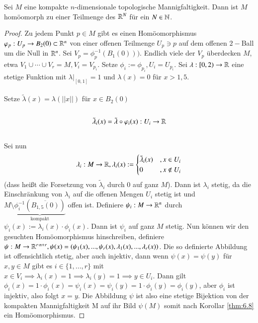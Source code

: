 \documentclass[a4paper,10pt]{scrartcl}
\begin{document}
\begin{st}
 Sei $M$ eine kompakte $n$-dimensionale topologische Mannigfaltigkeit. Dann ist $M$ homöomorph zu einer Teilmenge des $\mathbb{R}^N$ für ein $N\in \mathbb{N}$.
\end{st}
\fixme[fig36]
\begin{proof}
 Zu jedem Punkt $p\in M$ gibt es einen Homöomorphismus $\varphi_p: U_p\to B_2(0) \subset \mathbb{R}^n$ von einer offenen Teilmenge $U_p\ni p$ auf dem offenen $2-$Ball um die Null in $\mathbb{R}^n$. Sei $V_p=\phi_p^{-1}(B_1(0)))$. Endlich viele der $V_p$ überdecken $M$, etwa $V_1 \cup \dotsb \cup V_r=M, V_i=V_{p_i}$. Setze $\phi_i:=\phi_{p_i}, U_i=U_{p_i}$. Sei $\lambda:[0,2)\to \mathbb{R}$ eine stetige Funktion mit $\lambda|_{[0,1]}=1$ und $\lambda(x)=0$ für $x>1,5$.\\
\fixme[fig37]\\
Setze $\tilde \lambda(x)=\lambda(||x||)$ für $x\in B_2(0)$\\
\fixme[fig38]\\
\[
 \tilde \lambda_i(x)=\tilde\lambda \circ \varphi_i(x): U_i\to \mathbb{R}
\]
\fixme[fig39]\\
Sei nun 
\[
 \lambda_i: M \to \mathbb{R}, \lambda_i(x):=\begin{cases} \tilde \lambda_i(x)&, x\in U_i\\ 0 &,x \notin U_i \end{cases}
\]
(dass heißt die Forsetzung von $\tilde\lambda_i$ durch $0$ auf ganz $M$). Dann ist $\lambda_i$ stetig, da die Einschränkung von $\lambda_i$ auf die offenen Mengen $U_i$ stetig ist und $M\setminus \underbrace{\phi_i^{-1}(\overline{B_{1,5}(0)})}_{\text{kompakt}}$ offen ist. Definiere $\psi_i: M\to \mathbb{R}^n$ durch $\psi_i(x):= \lambda_i(x)\cdot \phi_i(x)$. Dann ist $\psi_i$ auf ganz $M$ stetig.  Nun können wir den gesuchten Homöomorphismus hinschreiben, definiere $\psi: M\to \mathbb{R}^{r\cdot n+r} , \psi(x)=(\psi_1(x),..., \psi_r(x), \lambda_1(x),..., \lambda_r(x))$. Die so definierte Abbildung ist offensichtlich stetig, aber auch injektiv, dann wenn $\psi(x)=\psi(y)$ für $x,y\in M$ gibt es $i\in \{1,..., r\}$ mit $x\in V_i \implies \lambda_i(x)=1 \implies \lambda_i(y)=1 \implies y \in U_i$. Dann gilt $\phi_i(x)=1\cdot \phi_i(x)=\psi_i(x)=\psi_i(y)=1\cdot \phi_i(y)= \phi_i(y)$, aber $\phi_i$ ist injektiv, also folgt $x=y$. Die Abbildung $\psi$ ist also eine stetige Bijektion von der kompakten Mannigfaltigkeit M auf ihr Bild $\psi(M)$ somit nach Korollar \ref{thm:6.8} ein Homöomorphismus.
\end{proof}
\end{document}
